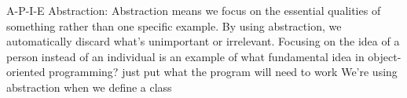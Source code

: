 
A-P-I-E
Abstraction:
  Abstraction means we focus on the essential qualities of something rather than one specific example. By using abstraction, we automatically discard what's unimportant or irrelevant.
  Focusing on the idea of a person instead of an individual is an example of what fundamental idea in object-oriented programming?
  just put what the program will need to work 
  We're using abstraction when we define a class
